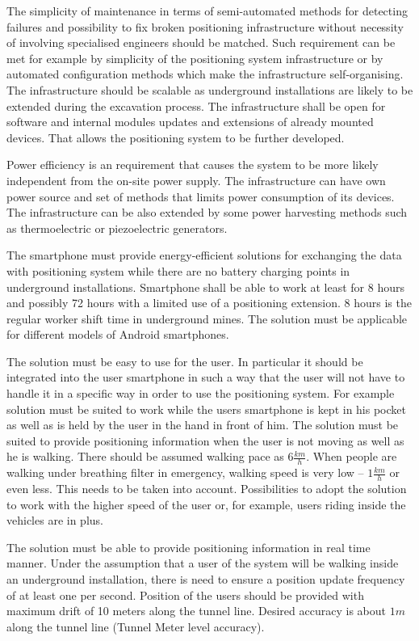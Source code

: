 \documentclass[../main.tex]{subfiles}
\begin{document}
The simplicity of maintenance in terms of semi-automated methods for detecting failures and possibility to fix broken positioning infrastructure without necessity of involving specialised engineers should be matched. Such requirement can be met for example by simplicity of the positioning system infrastructure or by automated configuration methods which make the infrastructure self-organising. The infrastructure should be  scalable as underground installations are likely to be extended during the excavation process. The infrastructure shall be open for software and internal modules updates and extensions of already mounted devices. That allows the positioning system to be further developed.

Power efficiency is an requirement that causes the system to be more likely independent from the on-site power supply. The infrastructure can have own power source and set of methods that limits power consumption of its devices. The infrastructure can be also extended by some power harvesting methods such as thermoelectric or piezoelectric generators.

The smartphone must provide energy-efficient solutions for exchanging the data with positioning system while there are no battery charging points in underground installations. Smartphone shall be able to work at least for 8 hours and possibly 72 hours with a limited use of a positioning extension. 8 hours is the regular worker shift time in underground mines. The solution must be applicable for different models of Android smartphones.

The solution must be easy to use for the user. In particular it should be integrated into the user smartphone in such a way that the user will not have to handle it in a specific way in order to use the positioning system. For example solution must be suited to work while the users smartphone is kept in his pocket as well as is held by the user in the hand in front of him. The solution must be suited to provide positioning information when the user is not moving as well as he is walking. There should be assumed walking pace as $6 \frac{km}{h}$. When people are walking under breathing filter in emergency, walking speed is very low -- $1 \frac{km}{h}$ or even less\cite{Thesis_CM}. This needs to be taken into account. Possibilities to adopt the solution to work with the higher speed of the user or, for example, users riding inside the vehicles are in plus.

The solution must be able to provide positioning information in real time manner. Under the assumption that a user of the system will be walking inside an underground installation, there is need to ensure a position update frequency of at least one per second. Position of the users should be provided with maximum drift of 10 meters along the tunnel line. Desired accuracy is about $1m$ along the tunnel line (Tunnel Meter level accuracy).
\end{document}

